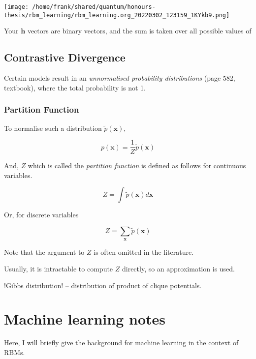 \documentclass[11pt]{article}
\begin{document}
\begin{center}
\texttt{[image: /home/frank/shared/quantum/honours-thesis/rbm\_learning/rbm\_learning.org\_20220302\_123159\_1KYkb9.png]}
\end{center}

Your \(\mathbf{h}\) vectors are binary vectors, and the sum is taken over all possible values of


\subsection{Contrastive Divergence}
\label{sec:org9b654ef}
Certain models result in an \emph{unnormalised probability distributions} (page 582, textbook), where the total probability is not 1.

\subsubsection{Partition Function}
\label{sec:orgb260372}
To normalise such a distribution \(\tilde{p}(\mathbf{x})\),

\begin{equation}
p(\mathbf{x}) = \frac{1}{Z} \tilde{p}(\mathbf{x})
\end{equation}

And, \(Z\) which is called the \emph{partition function} is defined as follows for continuous variables.

\begin{equation}
Z = \int \tilde{p}(\mathbf{x}) d\mathbf{x}
\end{equation}

Or, for discrete variables

\begin{equation}
Z = \sum_{\mathbf{x}} \tilde{p}(\mathbf{x})
\end{equation}

Note that the argument to \(Z\) is often omitted in the literature.

Usually, it is intractable to compute \(Z\) directly, so an approximation is used.

\begin{Notes}
!Gibbs distribution! -- distribution of product of clique potentials.
\end{Notes}

\section{Machine learning notes}
\label{sec:org00cf8e4}
Here, I will briefly give the background for machine learning in the context of RBMs.
\end{document}
